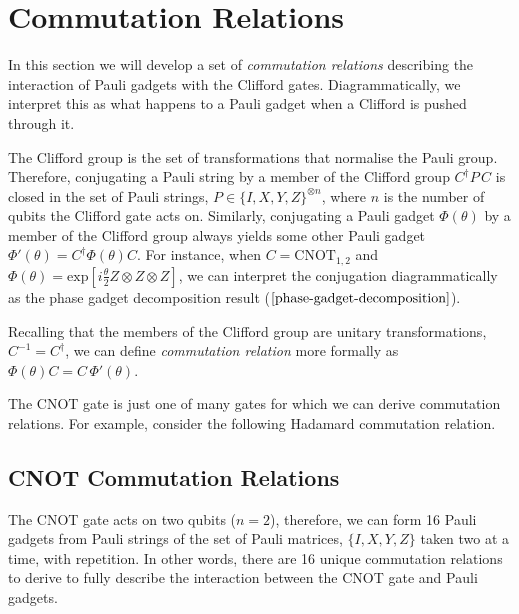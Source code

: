 \section{Commutation Relations}%
\label{commutation-relations}

In this section we will develop a set of \textit{commutation relations} describing the interaction of Pauli gadgets with the Clifford gates. Diagrammatically, we interpret this as what happens to a Pauli gadget when a Clifford is pushed through it.

The Clifford group is the set of transformations that normalise the Pauli group. Therefore, conjugating a Pauli string by a member of the Clifford group $C^\dagger P \, C$ is closed in the set of Pauli strings, $P \in \{I, X, Y, Z\}^{\otimes n}$, where $n$ is the number of qubits the Clifford gate acts on. Similarly, conjugating a Pauli gadget $\Phi(\theta)$ by a member of the Clifford group always yields some other Pauli gadget $\Phi'(\theta) = C^\dagger \Phi(\theta) C$. For instance, when $C = \text{CNOT}_{1, 2}$ and $\Phi(\theta) = \text{exp} \left[ i\frac{\theta}{2} Z \otimes Z \otimes Z \right]$, we can interpret the conjugation diagrammatically as the phase gadget decomposition result ($\ref{phase-gadget-decomposition}$).


Recalling that the members of the Clifford group are unitary transformations, $C^{-1} = C^\dagger$, we can define \textit{commutation relation} more formally as $\Phi(\theta) C = C \, \Phi'(\theta)$.


The CNOT gate is just one of many gates for which we can derive commutation relations. For example, consider the following Hadamard commutation relation.



\subsection{CNOT Commutation Relations}

The CNOT gate acts on two qubits ($n = 2$), therefore, we can form 16 Pauli gadgets from Pauli strings of the set of Pauli matrices, $\{I, X, Y, Z\}$ taken two at a time, with repetition. In other words, there are 16 unique commutation relations to derive to fully describe the interaction between the CNOT gate and Pauli gadgets.

